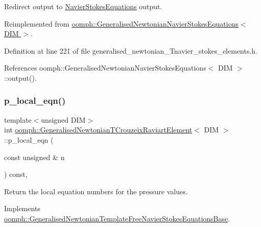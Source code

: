 Redirect output to \hyperlink{classoomph_1_1NavierStokesEquations}{Navier\+Stokes\+Equations} output. 



Reimplemented from \hyperlink{classoomph_1_1GeneralisedNewtonianNavierStokesEquations_a4cea0e2de7ce23a994bda1ee87222d21}{oomph\+::\+Generalised\+Newtonian\+Navier\+Stokes\+Equations$<$ D\+I\+M $>$}.



Definition at line 221 of file generalised\+\_\+newtonian\+\_\+\+Tnavier\+\_\+stokes\+\_\+elements.\+h.



References oomph\+::\+Generalised\+Newtonian\+Navier\+Stokes\+Equations$<$ D\+I\+M $>$\+::output().

\mbox{\label{classoomph_1_1GeneralisedNewtonianTCrouzeixRaviartElement_a8c03ca5840d0f0da302bea52518744d9}} 
\subsubsection{\texorpdfstring{p\+\_\+local\+\_\+eqn()}{p\_local\_eqn()}}
{\footnotesize\ttfamily template$<$unsigned D\+IM$>$ \\
int \hyperlink{classoomph_1_1GeneralisedNewtonianTCrouzeixRaviartElement}{oomph\+::\+Generalised\+Newtonian\+T\+Crouzeix\+Raviart\+Element}$<$ D\+IM $>$\+::p\+\_\+local\+\_\+eqn (\begin{DoxyParamCaption}\item[{const unsigned \&}]{n }\end{DoxyParamCaption}) const\hspace{0.3cm}{\ttfamily [inline]}, {\ttfamily [virtual]}}



Return the local equation numbers for the pressure values. 



Implements \hyperlink{classoomph_1_1GeneralisedNewtonianTemplateFreeNavierStokesEquationsBase_abacdc7add36a8da0b68b9f991e7973d9}{oomph\+::\+Generalised\+Newtonian\+Template\+Free\+Navier\+Stokes\+Equations\+Base}.



